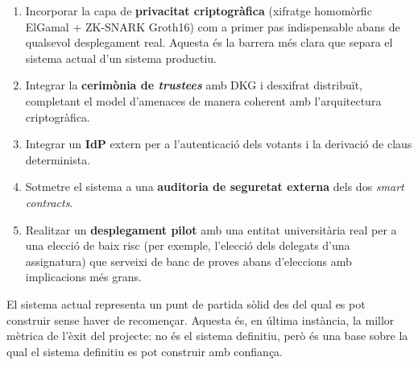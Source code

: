 \begin{enumerate}
    \item Incorporar la capa de \textbf{privacitat criptogràfica} (xifratge homomòrfic ElGamal + ZK-SNARK Groth16) com
    a primer pas indispensable abans de qualsevol desplegament real.
    Aquesta és la barrera més clara que separa el sistema actual d'un sistema productiu.

    \item Integrar la \textbf{cerimònia de \emph{trustees}} amb DKG i desxifrat distribuït, completant el model
    d'amenaces de manera coherent amb l'arquitectura criptogràfica.

    \item Integrar un \textbf{\acl{IdP}} extern per a l'autenticació dels votants i la derivació de claus determinista.

    \item Sotmetre el sistema a una \textbf{auditoria de seguretat externa} dels dos \emph{smart contracts}.

    \item Realitzar un \textbf{desplegament pilot} amb una entitat universitària real per a una elecció de baix risc
    (per exemple, l'elecció dels delegats d'una assignatura) que serveixi de banc de proves abans d'eleccions amb
    implicacions més grans.
\end{enumerate}

El sistema actual representa un punt de partida sòlid des del qual es pot construir sense haver de recomençar.
Aquesta és, en última instància, la millor mètrica de l'èxit del projecte: no és el sistema definitiu, però és una base
sobre la qual el sistema definitiu es pot construir amb confiança.
